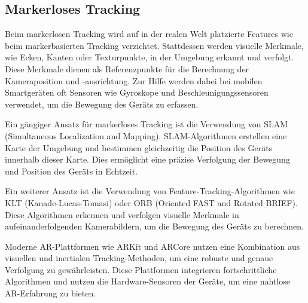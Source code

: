 \subsection{Markerloses Tracking}

Beim markerlosen Tracking wird auf in der realen Welt platzierte Features wie beim markerbasierten Tracking verzichtet. Stattdessen werden visuelle Merkmale, wie Ecken, Kanten oder Texturpunkte, in der Umgebung erkannt und verfolgt. Diese Merkmale dienen als Referenzpunkte für die Berechnung der Kameraposition und -ausrichtung. Zur Hilfe werden dabei bei mobilen Smartgeräten oft Sensoren wie Gyroskope und Beschleunigungssensoren verwendet, um die Bewegung des Geräts zu erfassen.

Ein gängiger Ansatz für markerloses Tracking ist die Verwendung von SLAM (Simultaneous Localization and Mapping). SLAM-Algorithmen erstellen eine Karte der Umgebung und bestimmen gleichzeitig die Position des Geräts innerhalb dieser Karte. Dies ermöglicht eine präzise Verfolgung der Bewegung und Position des Geräts in Echtzeit.

Ein weiterer Ansatz ist die Verwendung von Feature-Tracking-Algorithmen wie KLT (Kanade-Lucas-Tomasi) oder ORB (Oriented FAST and Rotated BRIEF). Diese Algorithmen erkennen und verfolgen visuelle Merkmale in aufeinanderfolgenden Kamerabildern, um die Bewegung des Geräts zu berechnen.

Moderne AR-Plattformen wie ARKit und ARCore nutzen eine Kombination aus visuellen und inertialen Tracking-Methoden, um eine robuste und genaue Verfolgung zu gewährleisten. Diese Plattformen integrieren fortschrittliche Algorithmen und nutzen die Hardware-Sensoren der Geräte, um eine nahtlose AR-Erfahrung zu bieten.


